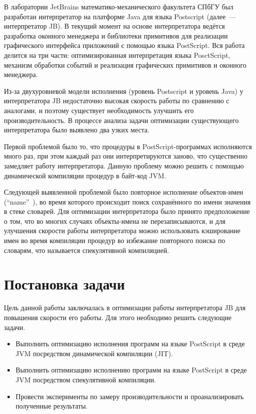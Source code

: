 	В лаборатории JetBrains математико-механического факультета СПбГУ был разработан интерпретатор на платформе Java для языка Postscript (далее~--- интерпретатор JB). В текущий момент на основе интерпретатора ведётся разработка оконного менеджера и библиотеки примитивов для реализации графического интерфейса приложений с помощью языка PostScript. Вся работа делится на три части: оптимизированная интерпретация языка PosctScript, механизм обработки событий и реализация графических примитивов и оконного менеджера.
	
	Из-за двухуровневой модели исполнения (уровень Postscript и уровень Java) у интерпретатора JB недостаточно высокая скорость работы по сравнению с  аналогами, и поэтому существует необходимость улучшить его производительность. В процессе анализа задачи оптимизации существующего интерпретатора было выявлено два узких места. 
	
	Первой проблемой было то, что процедуры в PostScript-программах исполняются много раз, при этом каждый раз они интерпретируются заново, что существенно замедляет работу интерпретатора. Данную проблему можно решить с помощью динамической компиляции процедур в байт-код JVM.
	
	Следующей выявленной проблемой было повторное исполнение объектов-имен (``name''~\cite{PLRM}), во время которого происходит поиск сохранённого по имени значения в стеке словарей. Для оптимизации интерпретатора было принято предположение о том, что во многих случаях объекты-имена не перезаписываются, и для улучшения скорости работы интерпретатора можно использовать кэширование имен во время компиляции процедур во избежание повторного поиска по словарям, что называется спекулятивной компиляцией.
	\section{Постановка задачи} 
	Цель данной работы заключалась в оптимизации работы интерпретатора JB для повышения скорости его работы. Для этого необходимо решить следующие задачи.
	\begin{itemize}
		\item Выполнить оптимизацию исполнения программ на языке PostScript в среде JVM посредством динамической компиляции (JIT).
		\item Выполнить оптимизацию исполнению программ на языке PostScript в среде JVM посредством спекулятивной компиляции.	
		\item Провести эксперименты по замеру производительности и проанализировать полученные результаты. 
	\end{itemize}
	

